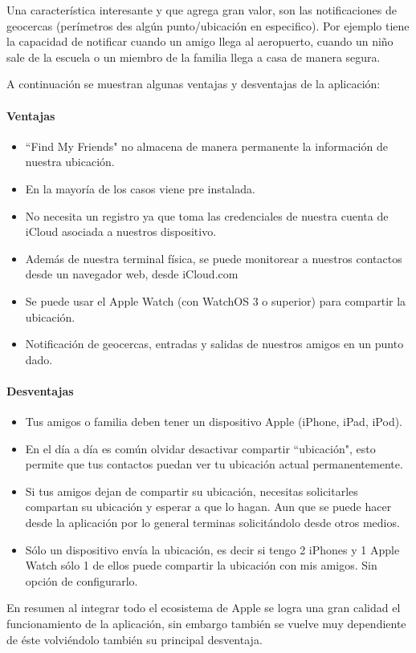 Una característica interesante y que agrega gran valor, son las notificaciones de geocercas (perímetros des algún punto/ubicación en especifico). Por ejemplo tiene la capacidad de notificar cuando un amigo llega al aeropuerto, cuando un niño sale de la escuela o un miembro de la familia llega a casa de manera segura. 

A continuación se muestran algunas ventajas y desventajas de la aplicación:

\paragraph{Ventajas}

\begin{itemize}
    \item ``Find My Friends" no almacena de manera permanente la información de nuestra ubicación.
    \item En la mayoría de los casos viene pre instalada.
    \item No necesita un registro ya que toma las credenciales de nuestra cuenta de iCloud asociada a nuestros dispositivo.
    \item Además de nuestra terminal física, se puede monitorear a nuestros contactos desde un navegador web, desde iCloud.com
    \item Se puede usar el Apple Watch (con WatchOS 3 o superior) para compartir la ubicación.
    \item Notificación de geocercas, entradas y salidas de nuestros amigos en un punto dado.
\end{itemize}

\paragraph{Desventajas}

\begin{itemize}
\item Tus amigos o familia deben tener un dispositivo Apple (iPhone, iPad, iPod).
\item En el día a día es común olvidar desactivar compartir ``ubicación", esto permite que tus contactos puedan ver tu ubicación actual permanentemente.
\item Si tus amigos dejan de compartir su ubicación, necesitas solicitarles compartan su ubicación y esperar a que lo hagan. Aun que se puede hacer desde la aplicación por lo general terminas solicitándolo desde otros medios.
\item Sólo un dispositivo envía la ubicación, es decir si tengo 2 iPhones y 1 Apple Watch sólo 1 de ellos puede compartir la ubicación con mis amigos. Sin opción de configurarlo.
\end{itemize}

En resumen al integrar todo el ecosistema de Apple se logra una gran calidad el funcionamiento de la aplicación, sin embargo también se vuelve muy dependiente de éste volviéndolo también su principal desventaja.
